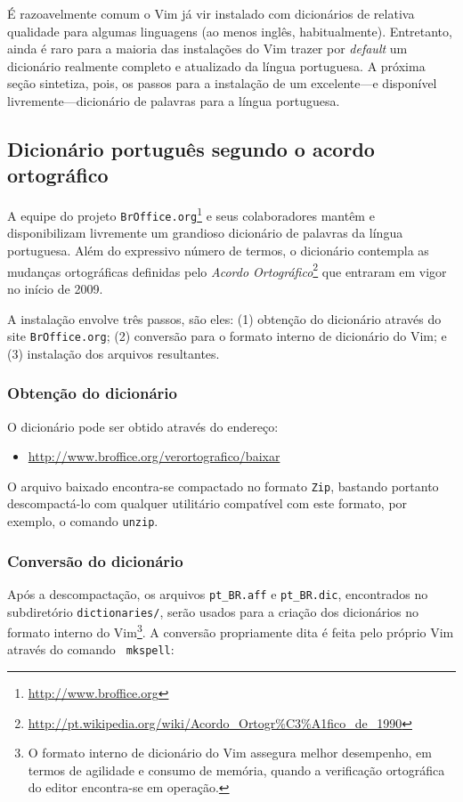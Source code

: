 É razoavelmente comum o Vim já vir instalado com dicionários de relativa
qualidade para algumas linguagens (ao menos inglês, habitualmente).
Entretanto, ainda é raro para a maioria das instalações do Vim trazer por {\em
default} um dicionário realmente completo e atualizado da língua portuguesa. A
próxima seção sintetiza, pois, os passos para a instalação de um excelente---e
disponível livremente---dicionário de palavras para a língua portuguesa.

\subsection{Dicionário português segundo o acordo ortográfico}

A equipe do projeto {\tt BrOffice.org}\footnote{\url{http://www.broffice.org}}
e seus colaboradores mantêm e disponibilizam livremente um grandioso dicionário
de palavras da língua portuguesa. Além do expressivo número de termos, o
dicionário contempla as mudanças ortográficas definidas pelo {\em Acordo
Ortográfico}\footnote{\url{http://pt.wikipedia.org/wiki/Acordo_Ortogr\%C3\%A1fico_de_1990}}
que entraram em vigor no início de 2009.

A instalação envolve três passos, são eles: (1) obtenção do dicionário
através do site {\tt BrOffice.org}; (2) conversão para o formato interno de
dicionário do Vim; e (3) instalação dos arquivos resultantes.

\subsubsection{Obtenção do dicionário}

O dicionário pode ser obtido através do endereço: 
\begin{itemize}
\item[] \url{http://www.broffice.org/verortografico/baixar}
\end{itemize}

O arquivo baixado encontra-se compactado no formato {\tt Zip}, bastando
portanto descompactá-lo com qualquer utilitário compatível com este formato,
por exemplo, o comando {\tt unzip}.

\subsubsection{Conversão do dicionário}

Após a descompactação, os arquivos \verb|pt_BR.aff| e \verb|pt_BR.dic|,
encontrados no subdiretório {\tt dictionaries/}, serão usados para a criação
dos dicionários no formato interno do Vim\footnote{O formato interno de dicionário
do Vim assegura melhor desempenho, em termos de agilidade e consumo de
memória, quando a verificação ortográfica do editor encontra-se em operação.}.
A conversão propriamente dita é feita pelo próprio Vim através do comando {\tt
mkspell}:

